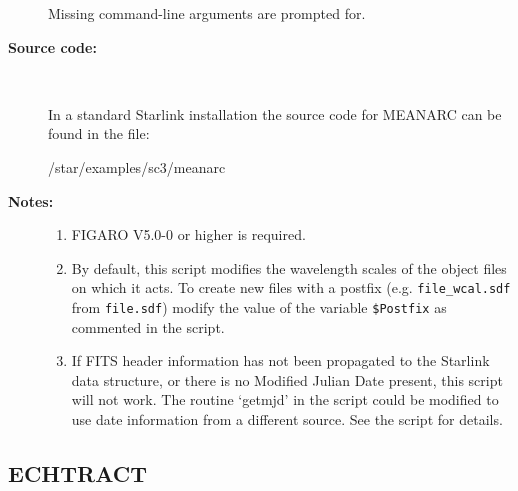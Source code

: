 \documentclass[twoside,11pt]{starlink}
\begin{document}
\begin{description}
\begin{enumerate}
\end{enumerate}

     Missing command-line arguments are prompted for.

\item [\textbf{Source code:}] \mbox{} \\
\begin{latexonly}
In a standard Starlink installation the source code for MEANARC can be found
in the file:
\begin{terminalv}
   /star/examples/sc3/meanarc
\end{terminalv}
\end{latexonly}



\newpage
\item [\textbf{Notes:}] \mbox{}
\begin{enumerate}

\item FIGARO V5.0-0 or higher is required.

\item By default, this script modifies the wavelength scales of the
      object files on which it acts.  To create new files with a
      postfix (e.g. \verb+file_wcal.sdf+ from \verb+file.sdf+) modify the
      value of the variable \verb+$Postfix+ as commented in the
      script.  %

\item If FITS header information has not been propagated to the
      Starlink data structure, or there is no Modified Julian Date
      present, this script will not work.  The routine `getmjd' in
      the script could be modified to use date information from a
      different source.  See the script for details.

\end{enumerate}

\end{description}

\newpage
\subsection{\label{se_echtract}ECHTRACT}
\end{document}
